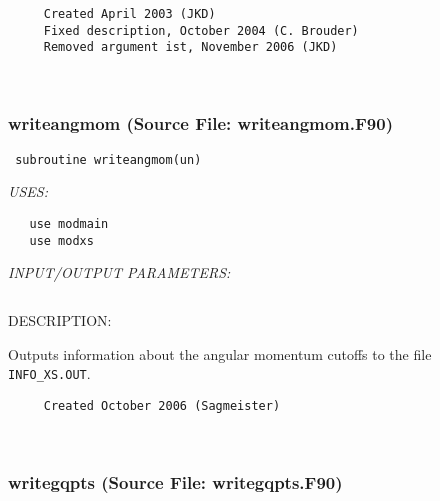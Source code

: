 \documentclass[11pt]{article}
\begin{document}
  
\begin{verbatim}     Created April 2003 (JKD)
     Fixed description, October 2004 (C. Brouder)
     Removed argument ist, November 2006 (JKD)\end{verbatim}


 
 
\mbox{}\hrulefill\ 
 
\subsubsection{writeangmom (Source File: writeangmom.F90)}


\begin{verbatim} subroutine writeangmom(un)\end{verbatim}{\em USES:}
\begin{verbatim}   use modmain
   use modxs\end{verbatim}{\em INPUT/OUTPUT PARAMETERS:}
\begin{verbatim} \end{verbatim}
{\sf DESCRIPTION:\\ }

    Outputs information about the angular momentum cutoffs to the file
     {\tt INFO\_XS.OUT}.
  
\begin{verbatim}     Created October 2006 (Sagmeister)\end{verbatim}










 
 
\mbox{}\hrulefill\ 
 
\subsubsection{writegqpts (Source File: writegqpts.F90)}
\end{document}
